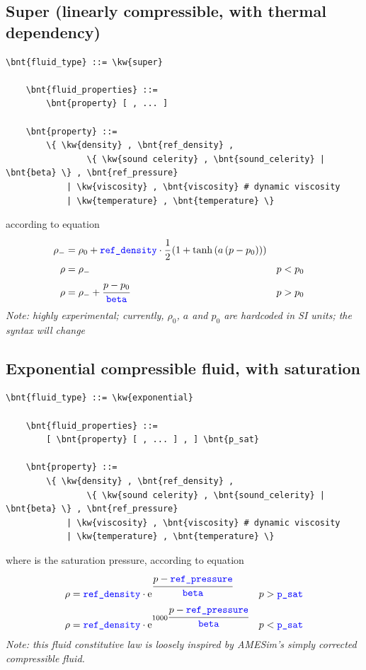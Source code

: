 \subsection{Super (linearly compressible, with thermal dependency)}
\begin{Verbatim}[commandchars=\\\{\}]
    \bnt{fluid_type} ::= \kw{super}

    \bnt{fluid_properties} ::= 
        \bnt{property} [ , ... ]

    \bnt{property} ::=
        \{ \kw{density} , \bnt{ref_density} ,
                \{ \kw{sound celerity} , \bnt{sound_celerity} | \bnt{beta} \} , \bnt{ref_pressure}
            | \kw{viscosity} , \bnt{viscosity} # dynamic viscosity
            | \kw{temperature} , \bnt{temperature} \}
\end{Verbatim}
according to equation
\begin{align}
	\rho_-
	&=
	\rho_0 + \textcolor{blue}{\texttt{ref\_density}} \cdot \cfrac{1}{2}\left( 
		1 + \tanh\left( a\left( p - p_0 \right) \right)
	 \right)
	\nonumber \\
	\rho
	&=
	\rho_-
		& p &< p_0
	\\
	\rho
	&=
	\rho_- + \cfrac{p - p_0}{\textcolor{blue}{\texttt{beta}}}
		& p &> p_0
	\nonumber
\end{align}
\emph{Note: highly experimental; currently, $\rho_0$, $a$ and $p_0$
are hardcoded in SI units; the syntax will change}

\subsection{Exponential compressible fluid, with saturation}
\begin{Verbatim}[commandchars=\\\{\}]
    \bnt{fluid_type} ::= \kw{exponential}

    \bnt{fluid_properties} ::= 
        [ \bnt{property} [ , ... ] , ] \bnt{p_sat}

    \bnt{property} ::=
        \{ \kw{density} , \bnt{ref_density} ,
                \{ \kw{sound celerity} , \bnt{sound_celerity} | \bnt{beta} \} , \bnt{ref_pressure}
            | \kw{viscosity} , \bnt{viscosity} # dynamic viscosity
            | \kw{temperature} , \bnt{temperature} \}
\end{Verbatim}
where  is the saturation pressure, according to equation
\begin{align}
	\rho &= \textcolor{blue}{\texttt{ref\_density}} \cdot \text{e}^{\cfrac{p - \textcolor{blue}{\texttt{ref\_pressure}}}{\textcolor{blue}{\texttt{beta}}}}
		& p &> \textcolor{blue}{\texttt{p\_sat}}
	\nonumber \\
	\rho &= \textcolor{blue}{\texttt{ref\_density}} \cdot \text{e}^{1000\cfrac{p - \textcolor{blue}{\texttt{ref\_pressure}}}{\textcolor{blue}{\texttt{beta}}}}
		& p &< \textcolor{blue}{\texttt{p\_sat}}
\end{align}
\emph{Note: this fluid constitutive law is loosely inspired by AMESim's
simply corrected compressible fluid.}



